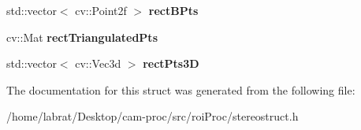 \begin{DoxyCompactItemize}
\item 
std\+::vector$<$ cv\+::\+Point2f $>$ {\bfseries rect\+B\+Pts}\hypertarget{structStereoContainer_a54fabddaf864ada3a354ac2beb33c7f3}{}\label{structStereoContainer_a54fabddaf864ada3a354ac2beb33c7f3}

\item 
cv\+::\+Mat {\bfseries rect\+Triangulated\+Pts}\hypertarget{structStereoContainer_a95cc182080881ab63172d9a45b95df7a}{}\label{structStereoContainer_a95cc182080881ab63172d9a45b95df7a}

\item 
std\+::vector$<$ cv\+::\+Vec3d $>$ {\bfseries rect\+Pts3D}\hypertarget{structStereoContainer_a04e461a4dfc824f74a6ca5910e6dcc88}{}\label{structStereoContainer_a04e461a4dfc824f74a6ca5910e6dcc88}

\end{DoxyCompactItemize}


The documentation for this struct was generated from the following file\+:\begin{DoxyCompactItemize}
\item 
/home/labrat/\+Desktop/cam-\/proc/src/roi\+Proc/stereostruct.\+h\end{DoxyCompactItemize}
